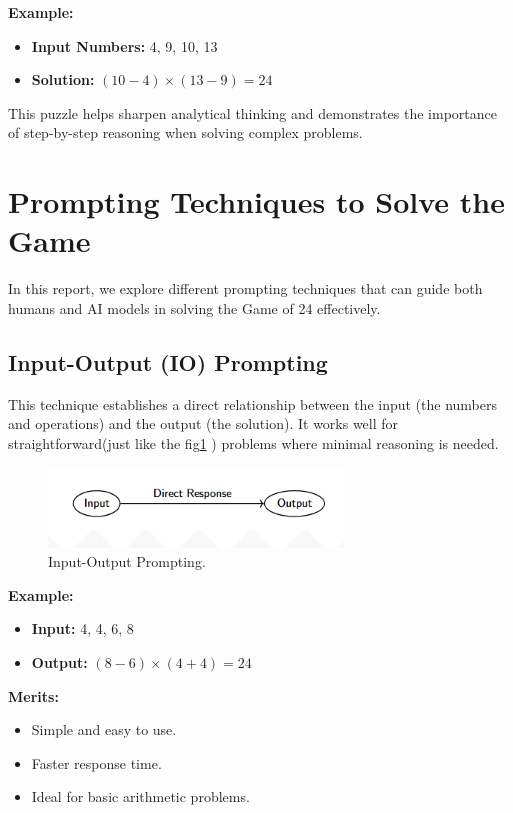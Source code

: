 \documentclass[12pt, a4paper]{article}
\begin{document}
\textbf{Example:}
\begin{itemize}
    \item \textbf{Input Numbers:} 4, 9, 10, 13
    \item \textbf{Solution:} \((10 - 4) \times (13 - 9) = 24\)
\end{itemize}

This puzzle helps sharpen analytical thinking and demonstrates the importance of step-by-step reasoning when solving complex problems.

\section{Prompting Techniques to Solve the Game}

In this report, we explore different prompting techniques that can guide both humans and AI models in solving the Game of 24 effectively.

\subsection{Input-Output (IO) Prompting}

This technique establishes a direct relationship between the input (the numbers and operations) and the output (the solution). It works well for straightforward(just like the fig\ref{fig:IO-prompting} )  problems where minimal reasoning is needed.

\begin{figure}[h]
    \centering
    \includegraphics[width=0.7\textwidth]{IO.png}
    \caption{Input-Output Prompting.}
    \label{fig:IO-prompting}
\end{figure}

\textbf{Example:}
\begin{itemize}
    \item \textbf{Input:} 4, 4, 6, 8
    \item \textbf{Output:} \((8 - 6) \times (4 + 4) = 24\)
\end{itemize}

\textbf{Merits:}
\begin{itemize}
    \item Simple and easy to use.
    \item Faster response time.
    \item Ideal for basic arithmetic problems.
\end{itemize}
\end{document}
